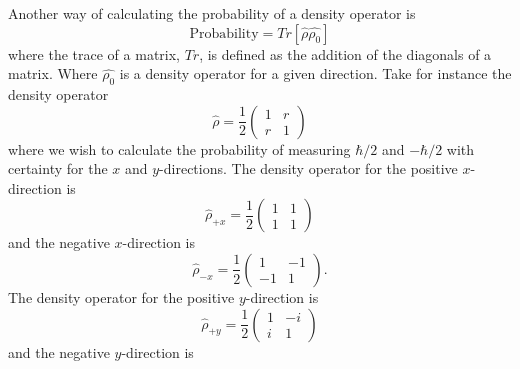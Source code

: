 \documentclass[twocolumn]{article}
\begin{document}
Another way of calculating the probability of a density operator is
\begin{equation} \label{eq:30}
\text{Probability}=Tr[\hat{\rho}\hat{\rho_0}]
\end{equation}
where the trace of a matrix, $Tr$, is defined as the addition of the diagonals of a matrix. Where $\hat{\rho_0}$ is a density operator for a given direction. Take for instance the density operator
\begin{equation} \label{eq:31}
\hat{\rho}=\frac{1}{2}
\begin{pmatrix}
1 & r \\
r & 1
\end{pmatrix}
\end{equation}
where we wish to calculate the probability of measuring $\hbar/2$ and $-\hbar/2$ with certainty for the $x$ and $y$-directions. The density operator for the positive $x$-direction is
\begin{equation} \label{eq:32}
\hat{\rho}_{+x}=\frac{1}{2}
\begin{pmatrix}
1 & 1 \\
1 & 1
\end{pmatrix}
\end{equation}
and the negative $x$-direction is
\begin{equation} \label{eq:33}
\hat{\rho}_{-x}=\frac{1}{2}
\begin{pmatrix}
1 & -1 \\
-1 & 1
\end{pmatrix}.
\end{equation}
The density operator for the positive $y$-direction is
\begin{equation} \label{eq:34}
\hat{\rho}_{+y}=\frac{1}{2}
\begin{pmatrix}
1 & -i \\
i & 1
\end{pmatrix}
\end{equation}
and the negative $y$-direction is
\end{document}
